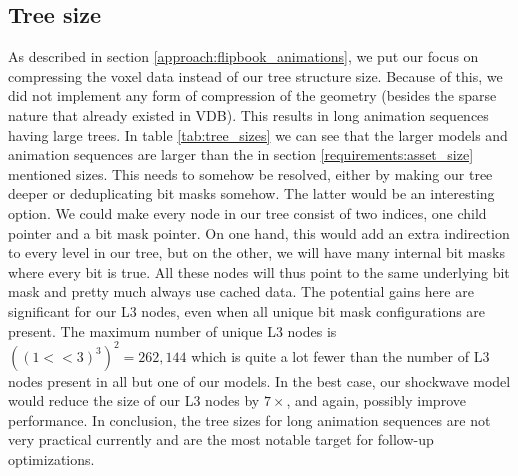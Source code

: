 \subsection{Tree size} \label{results:tree_size}
As described in section \ref{approach:flipbook_animations}, we put our focus on compressing the voxel data instead of our tree structure size. Because of this, we did not implement any form of compression of the geometry (besides the sparse nature that already existed in VDB). This results in long animation sequences having large trees. In table \ref{tab:tree_sizes} we can see that the larger models and animation sequences are larger than the in section \ref{requirements:asset_size} mentioned sizes. This needs to somehow be resolved, either by making our tree deeper or deduplicating bit masks somehow. The latter would be an interesting option. We could make every node in our tree consist of two indices, one child pointer and a bit mask pointer. On one hand, this would add an extra indirection to every level in our tree, but on the other, we will have many internal bit masks where every bit is true. All these nodes will thus point to the same underlying bit mask and pretty much always use cached data. The potential gains here are significant for our L3 nodes, even when all unique bit mask configurations are present. The maximum number of unique L3 nodes is $((1<<3)^3)^2 = 262,144$ which is quite a lot fewer than the number of L3 nodes present in all but one of our models. In the best case, our shockwave model would reduce the size of our L3 nodes by $7\times$, and again, possibly improve performance. In conclusion, the tree sizes for long animation sequences are not very practical currently and are the most notable target for follow-up optimizations.


